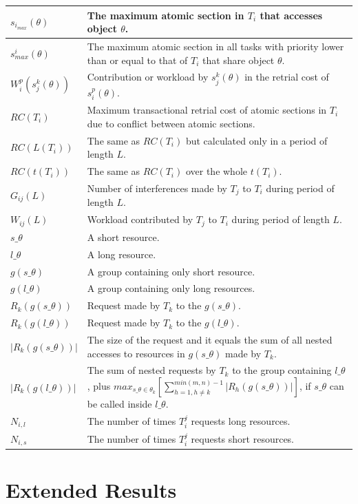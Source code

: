 \documentclass[a4paper,english]{article}
\providecommand{\tabularnewline}{\\}
\begin{document}
\begin{adjustwidth}{-1.5cm}{}
\begin{flushleft}
\begin{tabular}{|>{\raggedright}p{2.5cm}|>{\raggedright}p{12cm}|}
\hline 
$s_{i_{max}}(\theta)$ & The maximum atomic section in $T_{i}$ that accesses object $\theta$.\tabularnewline
\hline 
$s_{max}^{i}(\theta)$ & The maximum atomic section in all tasks with priority lower than or
equal to that of $T_{i}$ that share object $\theta$.\tabularnewline
\hline 
$W_{i}^{p}(s_{j}^{k}(\theta))$ & Contribution or workload by $s_{j}^{k}(\theta)$ in the retrial cost
of $s_{i}^{p}(\theta)$.\tabularnewline
\hline 
$RC(T_{i})$ & Maximum transactional retrial cost of atomic sections in $T_{i}$
due to conflict between atomic sections.\tabularnewline
\hline 
$RC(L(T_{i}))$ & The same as $RC(T_{i})$ but calculated only in a period of length
$L$.\tabularnewline
\hline 
$RC(t(T_{i}))$ & The same as $RC(T_{i})$ over the whole $t(T_{i})$.\tabularnewline
\hline 
$G_{ij}(L)$ & Number of interferences made by $T_{j}$ to $T_{i}$ during period
of length $L$.\tabularnewline
\hline 
$W_{ij}(L)$ & \raggedright{}Workload contributed by $T_{j}$ to $T_{i}$ during
period of length $L$.\tabularnewline
\hline 
$s\_\theta$ & A short resource.\tabularnewline
\hline 
$l\_\theta$ & A long resource.\tabularnewline
\hline 
$g(s\_\theta)$ & A group containing only short resource.\tabularnewline
\hline 
$g(l\_\theta)$ & A group containing only long resources.\tabularnewline
\hline 
$R_{k}(g(s\_\theta))$ & Request made by $T_{k}$ to the $g(s\_\theta)$.\tabularnewline
\hline 
$R_{k}(g(l\_\theta))$ & Request made by $T_{k}$ to the $g(l\_\theta)$.\tabularnewline
\hline 
$|R_{k}(g(s\_\theta))|$ & The size of the request and it equals the sum of all nested accesses
to resources in $g(s\_\theta)$ made by $T_{k}$.\tabularnewline
\hline 
$|R_{k}(g(l\_\theta))|$ & The sum of nested requests by $T_{k}$ to the group containing $l\_\theta$,
plus $max_{s\_\theta\in\theta_{k}}[\sum_{h=1,h\ne k}^{min(m,n)-1}|R_{h}(g(s\_\theta))|]$,
if $s\_\theta$ can be called inside $l\_\theta$.\tabularnewline
\hline 
$N_{i,l}$ & The number of times $T_{i}^{j}$ requests long resources.\tabularnewline
\hline 
$N_{i,s}$ & The number of times $T_{i}^{j}$ requests short resources.\tabularnewline
\hline
\end{tabular}
\par\end{flushleft}
\end{adjustwidth}

\section{\label{extended results}Extended Results}
\end{document}
